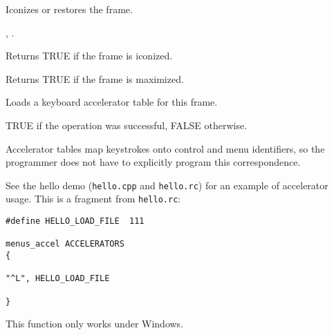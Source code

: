 
Iconizes or restores the frame.




, .

\label{wxframeisiconized}


Returns TRUE if the frame is iconized.

\label{wxframeismaximized}


Returns TRUE if the frame is maximized.

\label{wxframeloadaccelerators}


Loads a keyboard accelerator table for this frame.




TRUE if the operation was successful, FALSE otherwise.


Accelerator tables map keystrokes onto control and menu identifiers, so the
programmer does not have to explicitly program this correspondence.

See the hello demo ({\tt hello.cpp} and {\tt hello.rc}) for
an example of accelerator usage. This is a fragment from {\tt hello.rc}:

\begin{verbatim}
#define HELLO_LOAD_FILE  111

menus_accel ACCELERATORS
{

"^L", HELLO_LOAD_FILE

}
\end{verbatim}

This function only works under Windows.



